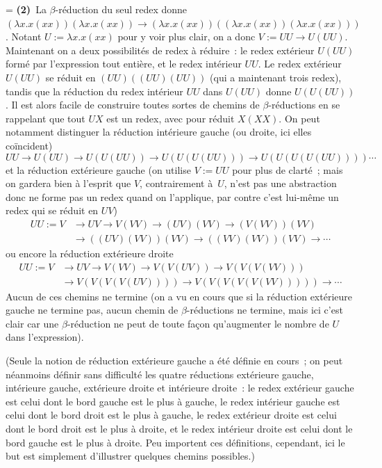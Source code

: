 \documentclass[12pt,a4paper]{article}
\theoremstyle{definition}
\newif\ifcorrige
\newenvironment{corrige}%
{\ifcorrige\relax\else\setbox0=\vbox\bgroup\fi%
\smallbreak\footnotesize\noindent{\underbar{\textit{Corrigé.}}\quad}}
{{\hbox{}\nobreak\hfill\checkmark}%
\ifcorrige\relax\else\egroup\fi\par}
\begin{document}
\begin{corrige}
\textbf{(2)} La $\beta$-réduction du seul redex donne $(\lambda
x.x(xx))(\lambda x.x(xx)) \rightarrow (\lambda x.x(xx))((\lambda
x.x(xx))(\lambda x.x(xx)))$.  Notant $U := \lambda x.x(xx)$ pour y
voir plus clair, on a donc $V := UU \rightarrow U(UU)$.  Maintenant on
a deux possibilités de redex à réduire : le redex extérieur $U(UU)$
formé par l'expression tout entière, et le redex intérieur $UU$.  Le
redex extérieur $U(UU)$ se réduit en $(UU)((UU)(UU))$ (qui a
maintenant trois redex), tandis que la réduction du redex intérieur
$UU$ dans $U(UU)$ donne $U(U(UU))$.  Il est alors facile de construire
toutes sortes de chemins de $\beta$-réductions en se rappelant que
tout $UX$ est un redex, avec pour réduit $X(XX)$.  On peut notamment
distinguer la réduction intérieure gauche (ou droite, ici elles
coïncident)
\[
UU \rightarrow U(UU) \rightarrow U(U(UU)) \rightarrow U(U(U(UU)))
\rightarrow U(U(U(U(UU)))) \cdots
\]
et la réduction extérieure gauche (on utilise $V := UU$ pour plus de
clarté ; mais on gardera bien à l'esprit que $V$, contrairement à $U$,
n'est pas une abstraction donc ne forme pas un redex quand on
l'applique, par contre c'est lui-même un redex qui se réduit en $UV$)
\[
\begin{aligned}
UU := V &\rightarrow UV \rightarrow V(VV) \rightarrow (UV)(VV)
\rightarrow (V(VV))(VV)\\
&\rightarrow ((UV)(VV))(VV) \rightarrow ((VV)(VV))(VV)
\rightarrow \cdots
\end{aligned}
\]
ou encore la réduction extérieure droite
\[
\begin{aligned}
UU := V &\rightarrow UV \rightarrow V(VV) \rightarrow V(V(UV))
\rightarrow V(V(V(VV)))\\
&\rightarrow V(V(V(V(UV)))) \rightarrow V(V(V(V(V(VV)))))
\rightarrow \cdots
\end{aligned}
\]
Aucun de ces chemins ne termine (on a vu en cours que si la réduction
extérieure gauche ne termine pas, aucun chemin de $\beta$-réductions
ne termine, mais ici c'est clair car une $\beta$-réduction ne peut de
toute façon qu'augmenter le nombre de $U$ dans l'expression).

(Seule la notion de réduction extérieure gauche a été définie en
cours ; on peut néanmoins définir sans difficulté les quatre
réductions extérieure gauche, intérieure gauche, extérieure droite et
intérieure droite : le redex extérieur gauche est celui dont le bord
gauche est le plus à gauche, le redex intérieur gauche est celui dont
le bord droit est le plus à gauche, le redex extérieur droite est
celui dont le bord droit est le plus à droite, et le redex intérieur
droite est celui dont le bord gauche est le plus à droite.  Peu
importent ces définitions, cependant, ici le but est simplement
d'illustrer quelques chemins possibles.)


\end{corrige}
\end{document}
